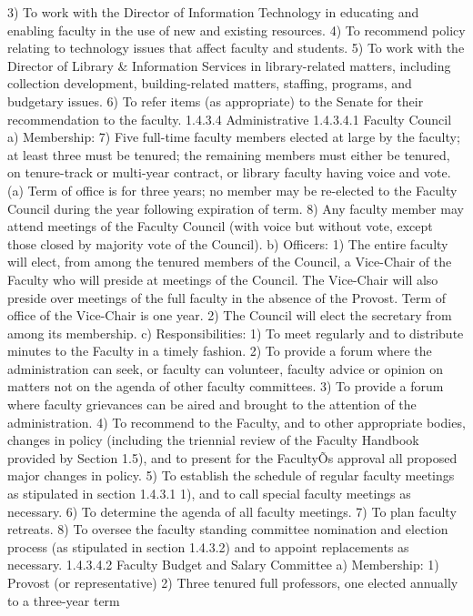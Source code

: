 \documentclass[letterpaper, 11pt]{article}
\begin{document}
3) To work with the Director of Information Technology in educating and enabling faculty in the use of new and existing resources. 
4) To recommend policy relating to technology issues that affect faculty and students.
5) To work with the Director of Library & Information Services in library-related matters, including collection development, building-related matters, staffing, programs, and budgetary issues.
6) To refer items (as appropriate) to the Senate for their recommendation to the faculty.
1.4.3.4 Administrative
1.4.3.4.1 Faculty Council
a) Membership:
7) Five full-time faculty members elected at large by the faculty; at least three must be tenured; the remaining members must either be tenured, on tenure-track or multi-year contract, or library faculty having voice and vote.
(a) Term of office is for three years; no member may be re-elected to the Faculty Council during the year following expiration of term.
8) Any faculty member may attend meetings of the Faculty Council (with voice but without vote, except those closed by majority vote of the Council).
b) Officers:
1) The entire faculty will elect, from among the tenured members of the Council, a Vice-Chair of the Faculty who will preside at meetings of the Council.  The Vice-Chair will also preside over meetings of the full faculty in the absence of the Provost.  Term of office of the Vice-Chair is one year.
2) The Council will elect the secretary from among its membership.
c) Responsibilities:
1) To meet regularly and to distribute minutes to the Faculty in a timely fashion.
2) To provide a forum where the administration can seek, or faculty can volunteer, faculty advice or opinion on matters not on the agenda of other faculty committees.
3) To provide a forum where faculty grievances can be aired and brought to the attention of the administration.
4) To recommend to the Faculty, and to other appropriate bodies, changes in policy (including the triennial review of the Faculty Handbook provided by Section 1.5), and to present for the FacultyÕs approval all proposed major changes in policy.
5) To establish the schedule of regular faculty meetings as stipulated in section 1.4.3.1 1), and to call special faculty meetings as necessary.
6) To determine the agenda of all faculty meetings.
7) To plan faculty retreats.
8) To oversee the faculty standing committee nomination and election process (as stipulated in section 1.4.3.2)  and to appoint replacements as necessary.
1.4.3.4.2   Faculty Budget and Salary Committee
a) Membership:
1) Provost (or representative)
2) Three tenured full professors, one elected annually to a three-year term
\end{document}
